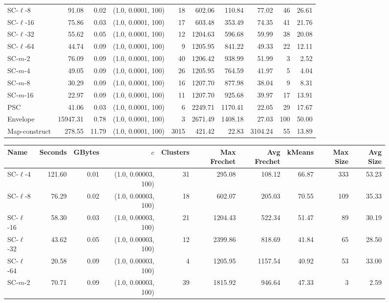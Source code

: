 \documentclass[11pt]{article}
\begin{document}
\begin{figure}
\begin{center}
\begin{minipage}{\textwidth}
{\begin{tabular}{@{}lrrrrrrrrr@{}}
SC-$\ell$-8 & 91.08 & 0.02 & (1.0, 0.0001, 100) & 18 & 602.06 & 110.84 & 77.02 & 46 & 26.61\\
SC-$\ell$-16 & 75.86 & 0.03 & (1.0, 0.0001, 100) & 17 & 603.48 & 353.49 & 74.35 & 41 & 21.76\\
SC-$\ell$-32 & 55.62 & 0.05 & (1.0, 0.0001, 100) & 12 & 1204.63 & 596.68 & 59.99 & 38 & 20.08\\
SC-$\ell$-64 & 44.74 & 0.09 & (1.0, 0.0001, 100) & 9 & 1205.95 & 841.22 & 49.33 & 22 & 12.11\\
SC-$m$-2 & 76.09 & 0.09 & (1.0, 0.0001, 100) & 40 & 1206.42 & 938.99 & 51.99 & 3 & 2.52\\
SC-$m$-4 & 49.05 & 0.09 & (1.0, 0.0001, 100) & 26 & 1205.95 & 764.59 & 41.97 & 5 & 4.04\\
SC-$m$-8 & 30.29 & 0.09 & (1.0, 0.0001, 100) & 16 & 1207.70 & 877.98 & 38.04 & 9 & 8.31\\
SC-$m$-16 & 22.97 & 0.09 & (1.0, 0.0001, 100) & 11 & 1207.70 & 925.68 & 39.97 & 17 & 13.91\\
PSC& 41.06 & 0.03 & (1.0, 0.0001, 100) & 6 & 2249.71 & 1170.41 & 22.05 & 29 & 17.67\\
Envelope & 15947.31 & 0.78 & (1.0, 0.0001, 100) & 3 & 2671.49 & 1408.18 & 27.03 & 100 & 50.00\\
Map-construct & 278.55 & 11.79 & (1.0, 0.0001, 100) & 3015 & 421.42 & 22.83 & 3104.24 & 55 & 13.89\\
        \bottomrule
    \end{tabular}
    }
    {
    \begin{tabular}{@{}lrrrrrrrrr@{}}
        \toprule
        Name & Seconds & GBytes & $c$ & Clusters & Max Frechet & Avg Frechet & kMeans & Max Size & Avg Size\\
        \midrule
        SC-$\ell$-4 & 121.60 & 0.01 & (1.0, 0.00003, 100) & 31 & 295.08 & 108.12 & 66.87 & 333 & 53.23\\
SC-$\ell$-8 & 76.29 & 0.02 & (1.0, 0.00003, 100) & 18 & 602.07 & 205.03 & 70.55 & 109 & 35.33\\
SC-$\ell$-16 & 58.30 & 0.03 & (1.0, 0.00003, 100) & 21 & 1204.43 & 522.34 & 51.47 & 89 & 30.19\\
SC-$\ell$-32 & 43.62 & 0.05 & (1.0, 0.00003, 100) & 12 & 2399.86 & 818.69 & 41.84 & 65 & 28.50\\
SC-$\ell$-64 & 20.58 & 0.09 & (1.0, 0.00003, 100) & 4 & 1205.95 & 1157.54 & 40.92 & 53 & 33.00\\
SC-$m$-2 & 70.71 & 0.09 & (1.0, 0.00003, 100) & 39 & 1815.92 & 946.64 & 47.33 & 3 & 2.59\\

\end{tabular}}
\end{minipage}
\end{center}
\end{figure}
\end{document}
